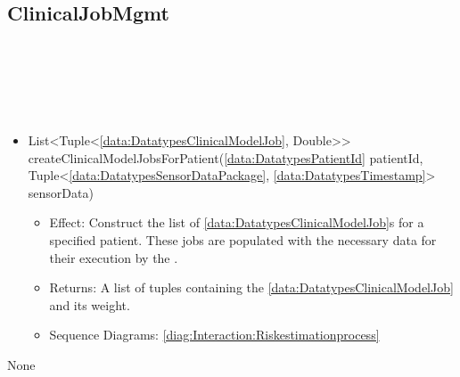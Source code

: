   \subsection{ClinicalJobMgmt}\label{int:InterfacesClinicalJobMgmt}
    \begin{description}
      \item[Provided by:] \iconcomponent{}~
      \item[Required by:] \iconcomponent{}~ 
      \item[Operations:] ~
    \begin{itemize}[noitemsep,nolistsep,leftmargin=-.25cm]
      \item \textsf{List\textless{}Tuple\textless{}\ref{data:DatatypesClinicalModelJob}, Double\textgreater{}\textgreater{} createClinicalModelJobsForPatient(\ref{data:DatatypesPatientId} patientId, Tuple\textless{}\ref{data:DatatypesSensorDataPackage}, \ref{data:DatatypesTimestamp}\textgreater{} sensorData)}
        \begin{itemize}[noitemsep,nolistsep]
           \item Effect: Construct the list of \ref{data:DatatypesClinicalModelJob}s for a specified patient. These jobs are populated with the necessary data for their execution by the . 
           \item Returns: A list of tuples containing the \ref{data:DatatypesClinicalModelJob} and its weight.
           \item Sequence Diagrams: \cref{diag:Interaction:Riskestimationprocess}
        \end{itemize}
    \end{itemize}
      \item[Diagrams:] None
    \end{description}

